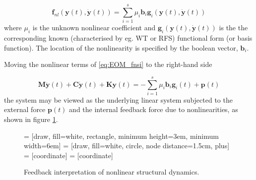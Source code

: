 \begin{equation}
  \label{eq:nonlin_fnsi_lummped}
  \bm f_{nl} \left( \bm y(t), \dot{\bm y}(t) \right) =
  \sum_{i=1}^s \mu_i \bm b_i \bm g_i \left( \bm y(t), \dot{\bm y}(t) \right)
\end{equation}
where $\mu_i$ is the unknown nonlinear coefficient and $\bm g_i \left( \bm y(t),
  \dot{\bm y}(t) \right)$ is the the corresponding known (characterised by eg.
WT or RFS) functional form (or basis function). The location of the nonlinearity
is specified by the boolean vector, $\bm b_i$.


Moving the nonlinear terms of \eqref{eq:EOM_fnsi} to the right-hand side

\begin{equation}
  \label{eq:EOM_fnsi_final}
  \bm M \ddot{\bm y}(t) + \bm C \dot{\bm y}(t) + \bm K \bm y(t) = -
  \sum_{i=1}^s \mu_i \bm b_i \bm g_i(t) + \bm p(t)
\end{equation}
the system may be viewed as the underlying linear system subjected to the
external force $\bm p(t)$ and the internal feedback force due to nonlinearities,
as shown in figure \ref{fig:fnsi_feedback}.

\begin{figure}[!ht]
  \centering
   = [draw, fill=white, rectangle, minimum height=3em, minimum width=6em]
   = [draw, fill=white, circle, node distance=1.5cm, plus]
   = [coordinate]
   = [coordinate]
  \caption{Feedback interpretation of nonlinear structural dynamics.}
  \label{fig:fnsi_feedback}
\end{figure}


